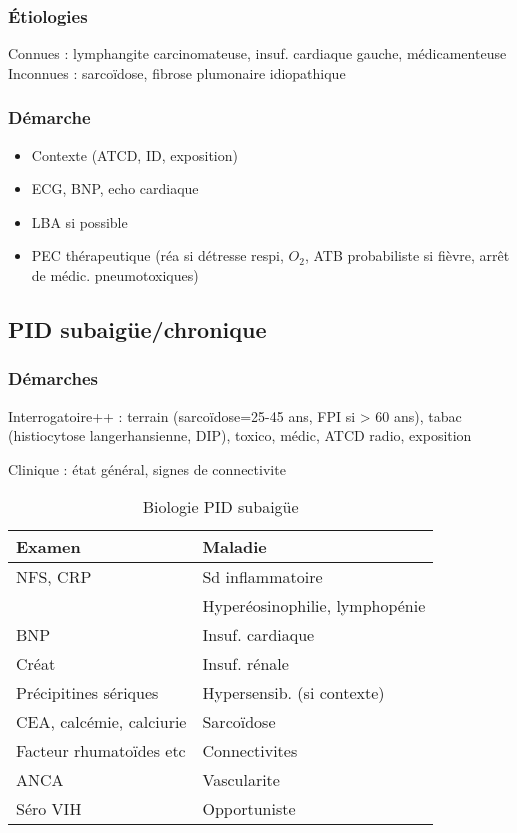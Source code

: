 \subsubsection{Étiologies}
Connues : lymphangite carcinomateuse, insuf. cardiaque gauche, médicamenteuse\\
Inconnues : sarcoïdose, fibrose plumonaire idiopathique
\subsubsection{Démarche}
\begin{itemize}
\item Contexte (ATCD, ID, exposition)
\item ECG, BNP, echo cardiaque
\item LBA si possible
\item PEC thérapeutique (réa si détresse respi, \(O_2\), ATB probabiliste si fièvre, arrêt de médic. pneumotoxiques)
\end{itemize}

\subsection{PID subaigüe/chronique}
\subsubsection{Démarches}
Interrogatoire++ : terrain (sarcoïdose=25-45 ans, \gls{FPI} si > 60 ans), tabac (histiocytose langerhansienne, \gls{DIP}), toxico, médic, ATCD radio, exposition

Clinique : état général, signes de connectivite

\begin{table}[htbp]
  \caption{Biologie PID subaigüe}
  \centering
  \begin{tabular}{ll}
    \toprule
    Examen & Maladie\\
    \midrule
    NFS, CRP & Sd inflammatoire\\
           & Hyperéosinophilie, lymphopénie\\
    BNP & Insuf. cardiaque\\
    Créat & Insuf. rénale\\
    Précipitines sériques & Hypersensib. (si contexte)\\
    CEA, calcémie, calciurie & Sarcoïdose\\
    Facteur rhumatoïdes etc & Connectivites\\
    ANCA & Vascularite\\
    Séro VIH & Opportuniste\\
    \bottomrule
  \end{tabular}
\end{table}

